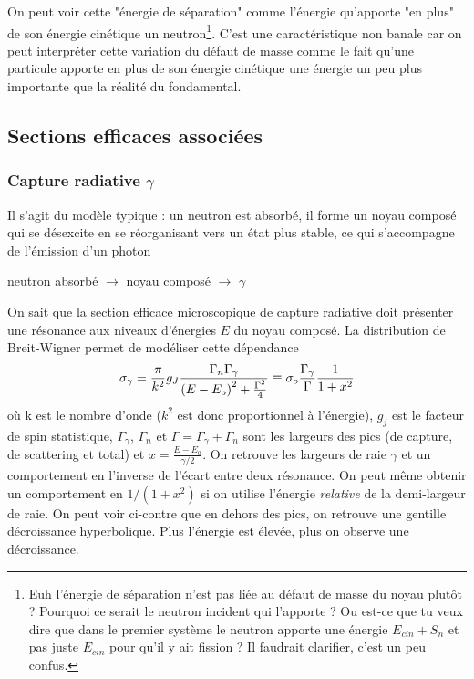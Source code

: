 On peut voir cette "énergie de séparation" comme l'énergie qu'apporte "en plus" de son énergie 
cinétique un neutron\footnote{Euh l'énergie de séparation n'est pas liée au défaut de masse du noyau plutôt ?
Pourquoi ce serait le neutron incident qui l'apporte ? Ou est-ce que tu veux dire que dans le premier
système le neutron apporte une énergie $E_{cin}+S_n$ et pas juste $E_{cin}$ pour qu'il y ait fission ?
Il faudrait clarifier, c'est un peu confus.}.	
C'est une caractéristique non banale car on peut interpréter cette variation 
du défaut de masse comme le fait qu'une particule apporte en plus de son énergie cinétique une 
énergie un peu plus importante que la réalité du fondamental. 

\subsection{Sections efficaces associées}
\subsubsection{Capture radiative $\gamma$}
Il s'agit du modèle typique : un neutron est absorbé, il forme un noyau composé qui se 
désexcite en se réorganisant vers un état plus stable, ce qui s'accompagne de l'émission d'un photon
\begin{center}
neutron absorbé $\longrightarrow$ noyau composé $\longrightarrow$ $\gamma$
\end{center}
On sait que la section efficace microscopique de capture radiative doit présenter une résonance
aux niveaux d'énergies $E$ du noyau composé. La distribution de Breit-Wigner permet de modéliser cette dépendance
\begin{equation}
{\sigma _\gamma } = \frac{\pi }{{{k^2}}}{g_J}\frac{{{\Gamma _n}{\Gamma _\gamma }}}{{{{(E - {E_o})}^2} + {\textstyle{{{\Gamma ^2}} \over 4}}}} \equiv {\sigma _o}\frac{{{\Gamma _\gamma }}}{\Gamma }\frac{1}{{1 + {x^2}}}
\end{equation}
où k est le nombre d'onde ($k^2$ est donc proportionnel à l'énergie), $g_j$ est le facteur de spin statistique,
$\Gamma_\gamma$, $\Gamma_n$ et $\Gamma = \Gamma_\gamma + \Gamma_n$ sont les largeurs des pics (de capture, de scattering
et total) et  $x= \frac{E-E_0}{\gamma/2}$. On retrouve les largeurs de raie $\gamma$ et un comportement en 
l'inverse de l'écart entre deux résonance. On peut même obtenir un comportement en $1/(1+x^2)$ si 
on utilise l'énergie \textit{relative} de la demi-largeur de raie. On peut voir ci-contre que 
en dehors des pics, on retrouve une gentille décroissance hyperbolique. Plus l'énergie est élevée, 
plus on observe une décroissance.

